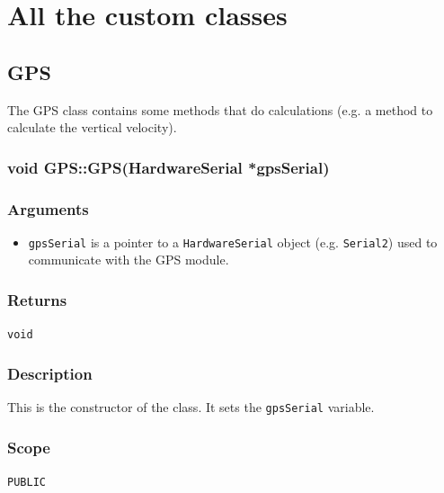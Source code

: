 \documentclass[a4paper,10pt]{article}
\newcommand{\func}[1]{\texttt{#1}}
\newenvironment{method}[2]{%
	\newcommand\funname{\func{#1}}
	\subsubsection[#1]{#2}
	
	\newenvironment{methodargs}{%
		\subsubsection*{Arguments}
	}{}
	
	\newenvironment{methodreturns}{%
		\subsubsection*{Returns}
	}{}
	
	\newenvironment{methoddesc}{%
		\subsubsection*{Description}
	}{}

	\newenvironment{methodscope}{
		\subsubsection*{Scope}
	}{}
}{}
\begin{document}
	\clearpage
	
	
	
	
	
	\section[Classes]{All the custom classes}
		\subsection{GPS}
			The GPS class contains some methods that do calculations (e.g. a method to calculate the vertical velocity). 
			
			\begin{method}{GPS}{void GPS::GPS(HardwareSerial *gpsSerial)}
				
				\begin{methodargs}
					\begin{itemize}
						\item \texttt{gpsSerial} is a pointer to a \texttt{HardwareSerial} object (e.g. \texttt{Serial2}) used to communicate with the GPS module. 
					\end{itemize}
				\end{methodargs}
				
				\begin{methodreturns}
					\texttt{void}
				\end{methodreturns}
				
				\begin{methoddesc}
					This is the constructor of the class. It sets the \texttt{gpsSerial} variable. 
				\end{methoddesc}
				
				\begin{methodscope}
					\texttt{PUBLIC}
				\end{methodscope}
				
				\vspace{3ex}
			\end{method}
		
\end{document}
